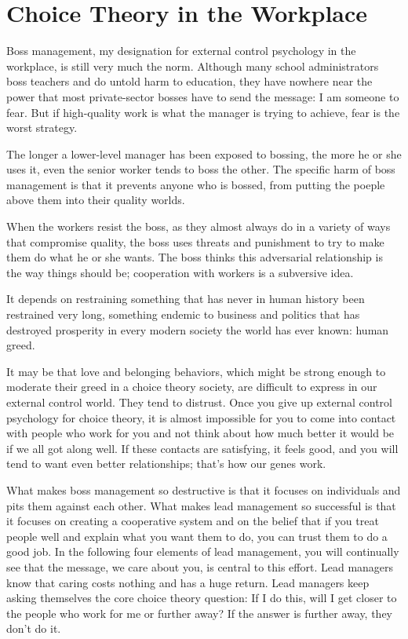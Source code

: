 \documentclass[ebook,12pt,oneside,openany]{memoir}
\begin{document}
\section{Choice Theory in the Workplace}
Boss management, my designation for external control psychology in the workplace, is still very much the norm.
Although many school administrators boss teachers and do untold harm to education, they have nowhere near the power that most private-sector bosses have to send the message: I am someone to fear.
But if high-quality work is what the manager is trying to achieve, fear is the worst strategy. 

The longer a lower-level manager has been exposed to bossing, the more he or she uses it, even the senior worker tends to boss the other.
The specific harm of boss management is that it prevents anyone who is bossed, from putting the poeple above them into their quality worlds.

When the workers resist the boss, as they almost always do in a variety of ways that compromise quality, the boss uses threats and punishment to try to make them do what he or she wants.
The boss thinks this adversarial relationship is the way things should be; cooperation with workers is a subversive idea.

It depends on restraining something that has never in human history been restrained very long, something endemic to business and politics that has destroyed prosperity in every modern society the world has ever known: human greed.

It may be that love and belonging behaviors, which might be strong enough to moderate their greed in a choice theory society, are difficult to express in our external control world.
They tend to distrust. Once you give up external control psychology for choice theory, it is almost impossible for you to come into contact with people who work for you and not think about how much better it would be if we all got along well.
If these contacts are satisfying, it feels good, and you will tend to want even better relationships; that's how our genes work.

What makes boss management so destructive is that it focuses on individuals and pits them against each other. What makes lead management so successful is that it focuses on creating a cooperative system and on the belief that if you treat people well and explain what you want them to do, you can trust them to do a good job.
In the following four elements of lead management, you will continually see that the message, we care about you, is central to this effort.
Lead managers know that caring costs nothing and has a huge return. 
Lead managers keep asking themselves the core choice theory question: If I do this, will I get closer to the people who work for me or further away?
If the answer is further away, they don't do it.
\end{document}
